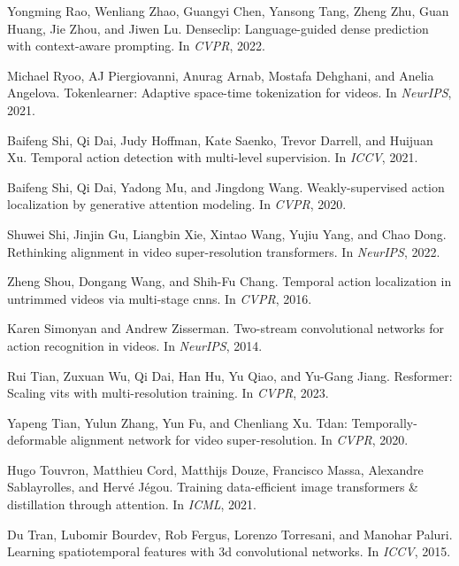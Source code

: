 \documentclass[10pt,twocolumn,letterpaper]{article}
\begin{document}
{\begin{thebibliography}{10}
Yongming Rao, Wenliang Zhao, Guangyi Chen, Yansong Tang, Zheng Zhu, Guan Huang,
  Jie Zhou, and Jiwen Lu.
\newblock Denseclip: Language-guided dense prediction with context-aware
  prompting.
\newblock In {\em CVPR}, 2022.

Michael Ryoo, AJ Piergiovanni, Anurag Arnab, Mostafa Dehghani, and Anelia
  Angelova.
\newblock Tokenlearner: Adaptive space-time tokenization for videos.
\newblock In {\em NeurIPS}, 2021.

Baifeng Shi, Qi Dai, Judy Hoffman, Kate Saenko, Trevor Darrell, and Huijuan Xu.
\newblock Temporal action detection with multi-level supervision.
\newblock In {\em ICCV}, 2021.

Baifeng Shi, Qi Dai, Yadong Mu, and Jingdong Wang.
\newblock Weakly-supervised action localization by generative attention
  modeling.
\newblock In {\em CVPR}, 2020.

Shuwei Shi, Jinjin Gu, Liangbin Xie, Xintao Wang, Yujiu Yang, and Chao Dong.
\newblock Rethinking alignment in video super-resolution transformers.
\newblock In {\em NeurIPS}, 2022.

Zheng Shou, Dongang Wang, and Shih-Fu Chang.
\newblock Temporal action localization in untrimmed videos via multi-stage
  cnns.
\newblock In {\em CVPR}, 2016.

Karen Simonyan and Andrew Zisserman.
\newblock Two-stream convolutional networks for action recognition in videos.
\newblock In {\em NeurIPS}, 2014.

Rui Tian, Zuxuan Wu, Qi Dai, Han Hu, Yu Qiao, and Yu-Gang Jiang.
\newblock Resformer: Scaling vits with multi-resolution training.
\newblock In {\em CVPR}, 2023.

Yapeng Tian, Yulun Zhang, Yun Fu, and Chenliang Xu.
\newblock Tdan: Temporally-deformable alignment network for video
  super-resolution.
\newblock In {\em CVPR}, 2020.

Hugo Touvron, Matthieu Cord, Matthijs Douze, Francisco Massa, Alexandre
  Sablayrolles, and Herv{\'e} J{\'e}gou.
\newblock Training data-efficient image transformers \& distillation through
  attention.
\newblock In {\em ICML}, 2021.

Du Tran, Lubomir Bourdev, Rob Fergus, Lorenzo Torresani, and Manohar Paluri.
\newblock Learning spatiotemporal features with 3d convolutional networks.
\newblock In {\em ICCV}, 2015.


\end{thebibliography}}
\end{document}
